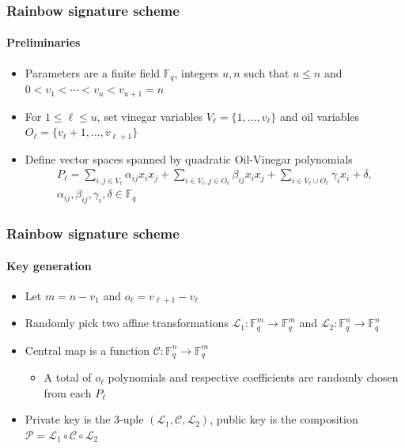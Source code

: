 \documentclass[12pt]{beamer}
\begin{document}
\begin{frame}
  \frametitle{Rainbow signature scheme}
  \framesubtitle{Preliminaries}
  \begin{itemize}
    \item Parameters are a finite field $\mathbb{F}_{q}$, integers $u, n$ such
        that $u \leq n$ and $0 < v_{1} < \cdots < v_{u} < v_{u + 1} = n$
    \item For $1 \leq \ell \leq u$, set vinegar variables
        $V_{\ell} = \{1, \dots, v_{\ell}\}$ and oil variables
          $O_{\ell} = \{v_{\ell} + 1, \dots, v_{\ell + 1}\}$
    \item Define vector spaces spanned by quadratic Oil-Vinegar polynomials
    \begin{align*}
      P_{\ell} = \sum_{i, j \in V_{\ell}} \alpha_{ij}  x_{i}  x_{j}
        + \sum_{i \in V_{\ell}, j \in O_{\ell}} \beta_{ij}  x_{i}  x_{j}
        + \sum_{i \in V_{\ell} \cup O_{\ell}} \gamma_{i}  x_{i} + \delta, \\
        \alpha_{ij}, \beta_{ij}, \gamma_{i}, \delta \in \mathbb{F}_{q}
    \end{align*}
  \end{itemize}
\end{frame}

\begin{frame}
  \frametitle{Rainbow signature scheme}
  \framesubtitle{Key generation}
  \begin{itemize}
    \item Let $m = n - v_{1}$ and $o_{\ell} = v_{\ell + 1} - v_{\ell}$
    \item Randomly pick two affine transformations
        $\mathcal{L}_{1} : \mathbb{F}_{q}^{m} \to \mathbb{F}_{q}^{m}$ and
        $\mathcal{L}_{2} : \mathbb{F}_{q}^{n} \to \mathbb{F}_{q}^{n}$
    \item Central map is a function
        $\mathcal{C} : \mathbb{F}_{q}^{n} \to \mathbb{F}_{q}^{m}$
      \begin{itemize}
        \item A total of $o_{\ell}$ polynomials and respective coefficients are
            randomly chosen from each $P_{\ell}$
      \end{itemize}
    \item Private key is the $3$-uple
        $(\mathcal{L}_{1}, \mathcal{C}, \mathcal{L}_{2})$, public key is the
          composition $\mathcal{P} = \mathcal{L}_{1} \circ \mathcal{C} \circ
          \mathcal{L}_{2}$
  \end{itemize}
\end{frame}
\end{document}
